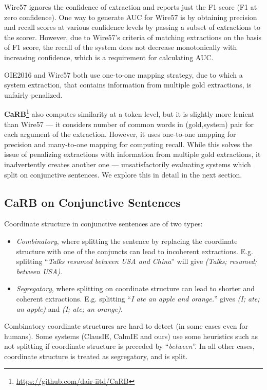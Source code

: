 \documentclass[11pt,a4paper]{article}
\begin{document}
Wire57 ignores the confidence of extraction and reports just the F1 score (F1 at zero confidence). One way to generate AUC for Wire57 is by obtaining precision and recall scores at various confidence levels by passing a subset of extractions to the scorer. However, due to Wire57's criteria of matching extractions on the basis of F1 score, the recall of the system does not decrease monotonically with increasing confidence, which is a requirement for calculating AUC.

OIE2016 and Wire57 both use one-to-one mapping strategy, due to which a system extraction, that contains information from multiple gold extractions, is unfairly penalized.

\noindent \textbf{CaRB}\footnote{\url{https://github.com/dair-iitd/CaRB}} also computes similarity at a token level, but it is slightly more lenient than Wire57 --- it considers number of common words in (gold,system) pair for each argument of the extraction. However, it uses one-to-one mapping for precision and
many-to-one mapping for computing recall. While this solves the issue of penalizing extractions with information from multiple gold extractions, it inadvertently creates another one --- unsatisfactorily evaluating systems which split on conjunctive sentences. We explore this in detail in the next section.

\subsection{CaRB on Conjunctive Sentences}\label{appendix:conjunctive}

Coordinate structure in conjunctive sentences are of two types: 
\begin{itemize}
    \item \textit{Combinatory}, where splitting the sentence by replacing the coordinate structure with one of the conjuncts can lead to incoherent extractions. E.g. splitting ``\textit{Talks resumed between USA and China}'' will give \textit{(Talks; resumed; between USA)}.
    \item \textit{Segregatory}, where splitting on coordinate structure can lead to shorter and coherent extractions. E.g. splitting ``\textit{I ate an apple and orange.}'' gives \textit{(I; ate; an apple)} and \textit{(I; ate; an orange)}.
\end{itemize}

\noindent Combinatory coordinate structures are hard to detect (in some cases even for humans). Some systems (ClausIE, CalmIE and ours) use some heuristics such as not splitting if coordinate structure is preceded by ``\textit{between}''. In all other cases, coordinate structure is treated as segregatory, and is split.
\end{document}

